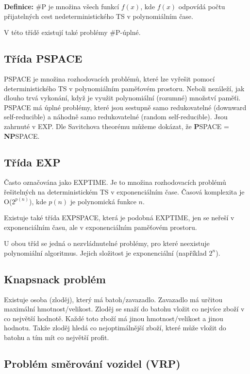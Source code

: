 \textbf{Definice:} \#P je množina všech funkcí $f(x)$, kde $f(x)$ odpovídá počtu přijatelných cest nedeterministického TS v polynomiálním čase.

\noindent V této třídě existují také problémy \#P-úplné.

\subsection{Třída PSPACE}

PSPACE je množina rozhodovacích problémů, které lze vyřešit pomocí deterministického TS v polynomiálním paměťovém prostoru.
Neboli nezáleží, jak dlouho trvá vykonání, když je využit polynomiální (rozumné) množství paměťi. 
PSPACE má úplné problémy, které jsou sestupně samo redukovatelné (downward self-reducible) a náhodně samo redukovatelné (random self-reducible).
Jsou zahrnuté v EXP.
Dle Savitchova theorému můžeme dokázat, že \textbf{P}SPACE = \textbf{NP}SPACE.

\subsection{Třída EXP}

Často označována jako EXPTIME.
Je to množina rozhodovacích problémů řešitelných na deterministickém TS v exponenciálním čase.
Časová komplexita je O($2^{p(n)}$), kde $p(n)$ je polynomická funkce $n$.

Existuje také třída EXPSPACE, která je podobná EXPTIME, jen se neřeší v exponenciálním času, ale v exponenciálním paměťovém prostoru.

U obou tříd se jedná o nezvládnutelné problémy, pro které neexistuje polynomiální algoritmus.
Jejich složitost je exponenciální (například $2^n$).

\subsection{Knapsnack problém}

Existuje osoba (zloděj), který má batoh/zavazadlo.
Zavazadlo má určitou maximální hmotnost/velikost.
Zloděj se snaží do batohu vložit co nejvíce zboží v co největší hodnotě. 
Každé toto zboží má jinou hmotnost/velikost a jinou hodnotu.
Takže zloděj hledá co nejoptimálnější zboží, které může vložit do batohu a tím mít co největší profit.

\subsection{Problém směrování vozidel (VRP)}

